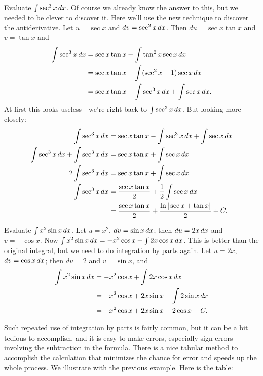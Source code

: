 \begin{example}
Evaluate $\int\sec^3 x\, d x$. Of course we already know the answer
to this, but we needed to be clever to discover it. Here we'll use the
new technique to discover the antiderivative.
Let $u=\sec x$ and $dv=\sec^2 x\, d x$. Then $du=\sec x\tan x$ and
$v=\tan x$ and
\begin{align*}
  \int\sec^3 x\, d x&=\sec x\tan x-\int \tan^2x\sec x\, d x \\
  &=\sec x\tan x-\int (\sec^2x-1)\sec x\, d x \\
  &=\sec x\tan x-\int \sec^3x\, d x +\int\sec x\, d x.
\end{align*}
At first this looks useless---we're right back to
$\int\sec^3x\, d x$. But looking more closely:
\begin{align*}
  \int\sec^3x\, d x&=\sec x\tan x-\int \sec^3x\, d x +\int\sec x\, d x \\
  \int\sec^3x\, d x+\int \sec^3x\, d x&=\sec x\tan x +\int\sec x\, d x \\
  2\int\sec^3x\, d x&=\sec x\tan x +\int\sec x\, d x \\
  \int\sec^3x\, d x&={\sec x\tan x\over2} +{1\over2}\int\sec x\, d x \\
  &={\sec x\tan x\over2} +{\ln|\sec x+\tan x|\over2}+C.
\end{align*}
\end{example}

\begin{example}
Evaluate $\int x^2\sin x\, d x$. 
Let $u=x^2$, $dv=\sin x\, d x$; then $du=2x\, d x$ and $v=-\cos x$. 
Now $\int x^2\sin x\, d x=-x^2\cos x+\int 2x\cos x\, d x$. This is
better than the original integral, but we need to do integration by
parts again. Let $u=2x$, $dv=\cos x\, d x$; then
$du=2$ and $v=\sin x$, and
\begin{align*}
  \int x^2\sin x\, d x&=-x^2\cos x+\int 2x\cos x\, d x \\
  &=-x^2\cos x+ 2x\sin x - \int 2\sin x\, d x \\
  &=-x^2\cos x+ 2x\sin x + 2\cos x + C. 
\end{align*}
\end{example}

Such repeated use of integration by parts is fairly common, but it can
be a bit tedious to accomplish, and it is easy to make
errors, especially sign errors involving the subtraction in the
formula. There is a nice tabular method to accomplish the calculation
that minimizes the chance for error and speeds up the whole
process. We illustrate with the previous example. Here is the
table:

